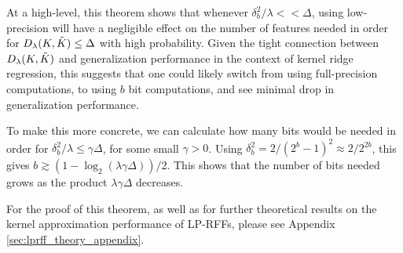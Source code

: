 At a high-level, this theorem shows that whenever $\delta_b^2/\lambda << \Delta$, using low-precision will have a negligible effect on the number of features needed in order for $D_{\lambda}(K,\tilde{K}) \leq \Delta$ with high probability.  Given the tight connection between $D_{\lambda}(K,\tilde{K})$ and generalization performance in the context of kernel ridge regression, this suggests that one could likely switch from using full-precision computations, to using $b$ bit computations, and see minimal drop in generalization performance.

To make this more concrete, we can calculate how many bits would be needed in order for $\delta^2_b/\lambda \leq \gamma\Delta$, for some small $\gamma > 0$. Using $\delta_b^2 = 2/(2^b-1)^2 \approx 2/2^{2b}$, this gives $b \gtrsim (1-\log_2(\lambda \gamma \Delta))/2$.  This shows that the number of bits needed grows as the product $\lambda \gamma \Delta$ decreases.

For the proof of this theorem, as well as for further theoretical results on the kernel approximation performance of LP-RFFs, please see Appendix \ref{sec:lprff_theory_appendix}.